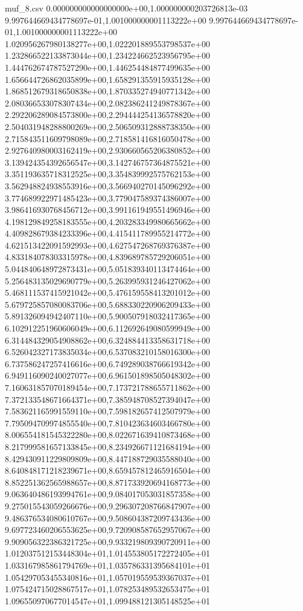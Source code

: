 \begin{filecontents*}{muf_8.csv}
0.000000000000000000e+00,1.000000000203726813e-03
9.997644669434778697e-01,1.001000000001113222e+00
9.997644669434778697e-01,1.001000000001113222e+00
1.020956267980138277e+00,1.022201889553798537e+00
1.232866522133873044e+00,1.234224662523956795e+00
1.444762674787527290e+00,1.446254484877499635e+00
1.656644726862035899e+00,1.658291355915935128e+00
1.868512679318650838e+00,1.870335274940771342e+00
2.080366533078307434e+00,2.082386241249878367e+00
2.292206289084573800e+00,2.294444254136578820e+00
2.504031948288800269e+00,2.506509312888738350e+00
2.715843511609798089e+00,2.718581416816050478e+00
2.927640980003162419e+00,2.930660565206380852e+00
3.139424354392656547e+00,3.142746757364875521e+00
3.351193635718312525e+00,3.354839992575762153e+00
3.562948824938553916e+00,3.566940270145096292e+00
3.774689922971485423e+00,3.779047589374386007e+00
3.986416930768456712e+00,3.991161949551496946e+00
4.198129849258183555e+00,4.203283349980665662e+00
4.409828679384233396e+00,4.415411789955214772e+00
4.621513422091592993e+00,4.627547268769376387e+00
4.833184078303315978e+00,4.839689785729206051e+00
5.044840648972873431e+00,5.051839340113474464e+00
5.256483135029690779e+00,5.263995931246427062e+00
5.468111537415921042e+00,5.476159558413201012e+00
5.679725857080083706e+00,5.688330220906209433e+00
5.891326094942407110e+00,5.900507918032417365e+00
6.102912251960606049e+00,6.112692649080599949e+00
6.314484329054908862e+00,6.324884413358631718e+00
6.526042327173835034e+00,6.537083210158016300e+00
6.737586247257416616e+00,6.749289038766619342e+00
6.949116090240027077e+00,6.961501898505048302e+00
7.160631857070189454e+00,7.173721788655711862e+00
7.372133548671664371e+00,7.385948708527394047e+00
7.583621165991559110e+00,7.598182657412507979e+00
7.795094709974855540e+00,7.810423634603466780e+00
8.006554181545322280e+00,8.022671639410873468e+00
8.217999581657133845e+00,8.234926671121684194e+00
8.429430911229809809e+00,8.447188729035588040e+00
8.640848171218239671e+00,8.659457812465916504e+00
8.852251362565988657e+00,8.871733920694168773e+00
9.063640486193994761e+00,9.084017053031857358e+00
9.275015543059266676e+00,9.296307208766847907e+00
9.486376534080610767e+00,9.508604387209743436e+00
9.697723460206553625e+00,9.720908587652957067e+00
9.909056322386321725e+00,9.933219809390720911e+00
1.012037512153448304e+01,1.014553805172272405e+01
1.033167985861794769e+01,1.035786331395684101e+01
1.054297053455340816e+01,1.057019559539367037e+01
1.075424715028867517e+01,1.078253489532653475e+01
1.096550970677014547e+01,1.099488121305148525e+01

\end{filecontents*}
